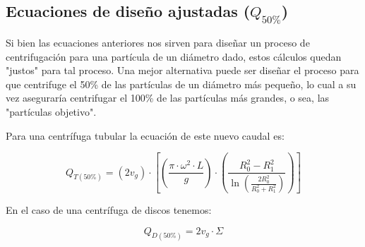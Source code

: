 \documentclass{AsignaturaResumen}
\begin{document}
\subsection{Ecuaciones de diseño ajustadas ($Q_{50\%}$)}

Si bien las ecuaciones anteriores nos sirven para diseñar un proceso de centrifugación para una partícula de un diámetro dado, estos cálculos quedan "justos" para tal proceso.  Una mejor alternativa puede ser diseñar el proceso para que centrifuge el 50\% de las partículas de un diámetro más pequeño, lo cual a su vez aseguraría centrifugar el 100\% de las partículas más grandes, o sea, las "partículas objetivo".

Para una centrífuga tubular la ecuación de este nuevo caudal es:

\begin{equation}\label{eq:diseño_de_centrifugas_tubulares_50}
    Q_{T(50\%)} = (2v_{g}) \cdot \left[ \left(\frac{\pi\cdot\omega^{2}\cdot L}{g}\right) \cdot \left(\frac{R_{0}^{2} - R_{1}^{2}}{\ln\left(\frac{2R_{0}^{2}}{R_{0}^{2} + R_{1}^{2}}\right)}\right) \right]
\end{equation}

En el caso de una centrífuga de discos tenemos:

\begin{equation}\label{eq:diseño_de_centrifugas_de_discos_50}
    Q_{D(50\%)} = 2v_{g} \cdot \Sigma
\end{equation}





\ifx\ISMAIN\undefined
    
\end{document}
